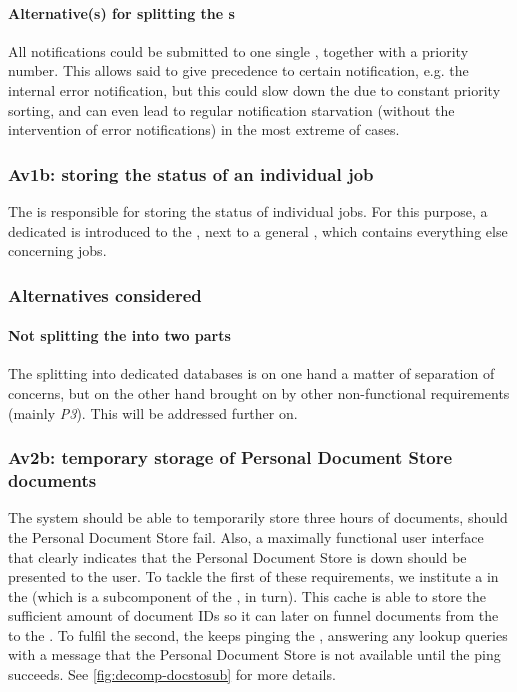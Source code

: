 \paragraph{Alternative(s) for splitting the s} All notifications could be submitted to one single , together with a priority number. This allows said  to give precedence to certain notification, e.g. the internal error notification, but this could slow down the  due to constant priority sorting, and can even lead to regular notification starvation (without the intervention of error notifications) in the most extreme of cases.

\subsubsection{Av1b: storing the status of an individual job}\label{march:av1b}
The  is responsible for storing the status of individual jobs. For this purpose, a dedicated  is introduced to the , next to a general , which contains everything else concerning jobs.

\subsubsection*{Alternatives considered}
\paragraph{Not splitting the  into two parts} The splitting into dedicated databases is on one hand a matter of separation of concerns, but on the other hand brought on by other non-functional requirements (mainly \emph{P3}). This will be addressed further on.

\subsubsection{Av2b: temporary storage of Personal Document Store documents}\label{march:av2b}
The system should be able to temporarily store three hours of documents, should the Personal Document Store fail. Also, a maximally functional user interface that clearly indicates that the Personal Document Store is down should be presented to the user. To tackle the first of these requirements, we institute a  in the  (which is a subcomponent of the , in turn). This cache is able to store the sufficient amount of document IDs so it can later on funnel documents from the  to the . To fulfil the second, the  keeps pinging the , answering any lookup queries with a message that the Personal Document Store is not available until the ping succeeds. See \ref{fig:decomp-docstosub} for more details.

